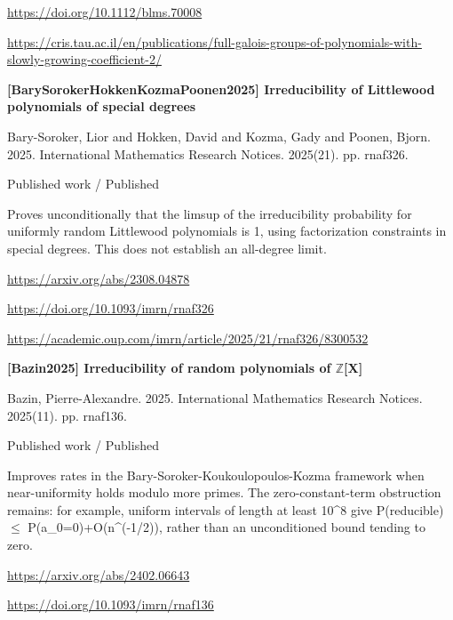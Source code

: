 \documentclass[11pt,a4paper,oneside,openany]{book}
\begin{document}
{\footnotesize\url{https://doi.org/10.1112/blms.70008}}\par
{\footnotesize\url{https://cris.tau.ac.il/en/publications/full-galois-groups-of-polynomials-with-slowly-growing-coefficient-2/}}\par
\vspace{9pt}
\hypertarget{ref:BarySorokerHokkenKozmaPoonen2025}{}
{\sffamily\bfseries\color{atlasgreen}[BarySorokerHokkenKozmaPoonen2025] Irreducibility of Littlewood polynomials of special degrees}\par
\color{black} Bary-Soroker, Lior and Hokken, David and Kozma, Gady and Poonen, Bjorn. 2025. International Mathematics Research Notices. 2025(21). pp. rnaf326.\par
{\small\sffamily\color{atlasgold}Published work / Published}\par
\color{black} Proves unconditionally that the limsup of the irreducibility probability for uniformly random Littlewood polynomials is 1, using factorization constraints in special degrees. This does not establish an all-degree limit.\par
{\footnotesize\url{https://arxiv.org/abs/2308.04878}}\par
{\footnotesize\url{https://doi.org/10.1093/imrn/rnaf326}}\par
{\footnotesize\url{https://academic.oup.com/imrn/article/2025/21/rnaf326/8300532}}\par
\vspace{9pt}
\hypertarget{ref:Bazin2025}{}
{\sffamily\bfseries\color{atlasgreen}[Bazin2025] Irreducibility of random polynomials of \ensuremath{\mathbb Z}[X]}\par
\color{black} Bazin, Pierre-Alexandre. 2025. International Mathematics Research Notices. 2025(11). pp. rnaf136.\par
{\small\sffamily\color{atlasgold}Published work / Published}\par
\color{black} Improves rates in the Bary-Soroker-Koukoulopoulos-Kozma framework when near-uniformity holds modulo more primes. The zero-constant-term obstruction remains: for example, uniform intervals of length at least 10\textasciicircum{}8 give P(reducible) \ensuremath{\le} P(a\_\allowbreak{}0=0)+O(n\textasciicircum{}(-1/2)), rather than an unconditioned bound tending to zero.\par
{\footnotesize\url{https://arxiv.org/abs/2402.06643}}\par
{\footnotesize\url{https://doi.org/10.1093/imrn/rnaf136}}\par
\end{document}

